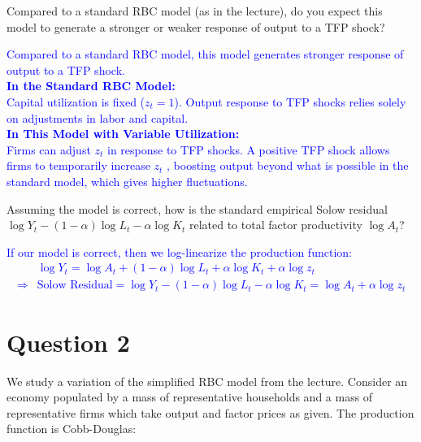 \begin{problem*}[4]
    Compared to a standard RBC model (as in the lecture), do you expect this model to generate a
stronger or weaker response of output to a TFP shock?
\end{problem*}

\begin{solution}
    \textcolor{blue}{
        Compared to a standard RBC model, this model generates stronger response of output to a TFP shock.\\
        \textbf{In the Standard RBC Model:}\\
        Capital utilization is fixed ($z_t=1$). Output response to TFP shocks relies solely on adjustments in labor and capital.\\
        \textbf{In This Model with Variable Utilization:}\\
        Firms can adjust $z_t$ in response to TFP shocks.
        A positive TFP shock allows firms to temporarily increase $z_t$ , boosting output beyond what is possible in the standard model, which gives higher fluctuations.
    }
\end{solution}

\begin{problem*}[5]
    Assuming the model is correct, how is the standard empirical Solow residual $\log Y_t-(1-\alpha)\log L_t-\alpha\log K_{t}$ 
    related to total factor productivity $\log A_{t}$? 
\end{problem*}

\begin{solution}
    \textcolor{blue}{
        If our model is correct, then we log-linearize the production function:
    \begin{align*}
        & \log Y_t = \log A_t + (1-\alpha)\log L_t + \alpha \log K_t + \alpha \log z_t \\
        \Rightarrow & \text{Solow Residual} = \log Y_t - (1-\alpha)\log L_t - \alpha \log K_t = \log A_t + \alpha \log z_t
    \end{align*}
    }
\end{solution}

\section*{Question 2}

We study a variation of the simplified RBC model from the lecture. Consider an economy populated by a mass of representative households and a mass of representative firms which take output and factor prices as given. The production function is Cobb-Douglas:

